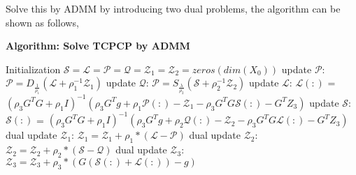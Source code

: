 \documentclass[a4paper,12pt]{article}
\theoremstyle{mystyle}
\begin{document}
\begin{CJK*}{GBK}{song}
Solve this by ADMM by introducing two dual problems, the algorithm can be shown as follows,

\begin{algorithm}[!htbp]
  \caption*{\textbf{Algorithm: Solve TCPCP by ADMM}}
  \begin{algorithmic}[1]
    \State Initialization $\mathcal{S}=\mathcal{L}=\mathcal{P}=\mathcal{Q}=\mathcal{Z}_1=\mathcal{Z}_2=zeros(dim(X_0))$
        \State update $\mathcal{P}$: $\mathcal{P}=D_{\frac{1}{\rho_1}}(\mathcal{L}+\rho_1^{-1}\mathcal{Z}_1)$
        \State update $\mathcal{Q}$: $\mathcal{P}=S_{\frac{\lambda}{\rho_2}}(\mathcal{S}+\rho_2^{-1}\mathcal{Z}_2)$
        \State update $\mathcal{L}$: $\mathcal{L}(:)$ = $(\rho_3 G^TG+\rho_1I)^{-1}
                                                (\rho_3 G^T g+\rho_1\mathcal{P}(:)-\mathcal{Z}_1-\rho_3 G^TG\mathcal{S}(:)-G^TZ_3)$
        \State update $\mathcal{S}$: $\mathcal{S}(:)$ = $(\rho_3 G^TG+\rho_1I)^{-1}
                                                (\rho_3 G^T g+\rho_2\mathcal{Q}(:)-\mathcal{Z}_2-\rho_3 G^TG\mathcal{L}(:)-G^TZ_3)$
        \State dual update $\mathcal{Z}_1$: $\mathcal{Z}_1=\mathcal{Z}_1+\rho_1*(\mathcal{L-P})$
        \State dual update $\mathcal{Z}_2$: $\mathcal{Z}_2=\mathcal{Z}_2+\rho_2*(\mathcal{S-Q})$
        \State dual update $\mathcal{Z}_3$: $\mathcal{Z}_3=\mathcal{Z}_3+\rho_3*(G\mathcal{(S(:)+L(:))}-g)$
    \EndFor
  \end{algorithmic}
\end{algorithm}


\newpage    %
\end{CJK*}
\end{document}
